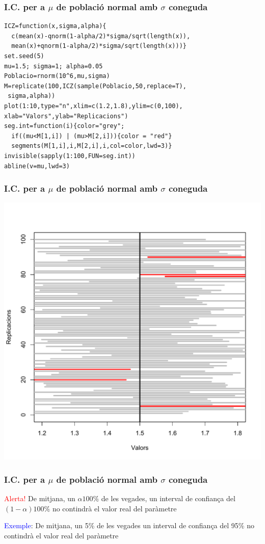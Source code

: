 \documentclass[12pt,t]{beamer}
\newcommand{\red}[1]{\textcolor{red}{#1}}
\newcommand{\blue}[1]{\textcolor{blue}{#1}}
\theoremstyle{plain}
\theoremstyle{definition}
\begin{document}
\begin{frame}[fragile]
\frametitle{I.C. per a $\mu$ de població normal amb $\sigma$ coneguda}
\vspace*{-4ex}

\small
\begin{verbatim}
ICZ=function(x,sigma,alpha){
  c(mean(x)-qnorm(1-alpha/2)*sigma/sqrt(length(x)), 
  mean(x)+qnorm(1-alpha/2)*sigma/sqrt(length(x)))}
set.seed(5)
mu=1.5; sigma=1; alpha=0.05
Poblacio=rnorm(10^6,mu,sigma)
M=replicate(100,ICZ(sample(Poblacio,50,replace=T),
 sigma,alpha))
plot(1:10,type="n",xlim=c(1.2,1.8),ylim=c(0,100),
xlab="Valors",ylab="Replicacions")
seg.int=function(i){color="grey";
  if((mu<M[1,i]) | (mu>M[2,i])){color = "red"}
  segments(M[1,i],i,M[2,i],i,col=color,lwd=3)}
invisible(sapply(1:100,FUN=seg.int))
abline(v=mu,lwd=3)
\end{verbatim}
\end{frame}

\begin{frame}
\frametitle{I.C. per a $\mu$ de població normal amb $\sigma$ coneguda}
\vspace*{-1cm}

\begin{center}
\includegraphics[width=0.9\linewidth]{intervals1}
\end{center}
\end{frame}

\begin{frame}[fragile]
\frametitle{I.C. per a $\mu$ de població normal amb $\sigma$ coneguda}

\begin{block}{\red{Alerta!}}
De mitjana, un $\alpha100\%$ de les vegades, un interval de confiança del $(1-\alpha)100\%$  no contindrà el valor real del paràmetre
\end{block}

\blue{Exemple}: De mitjana, un 5\% de les vegades un interval de confiança del 95\% no contindrà el valor real del paràmetre



\end{frame}
\end{document}
